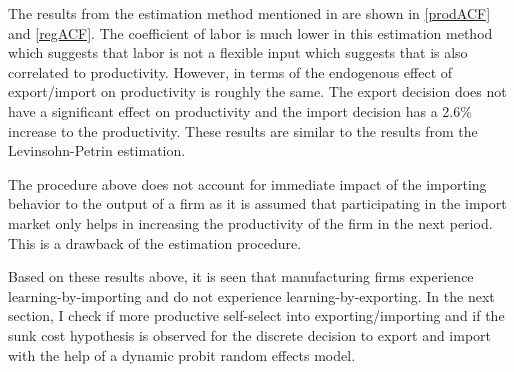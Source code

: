 \documentclass[11pt]{article}
\begin{document}
The results from the estimation  method mentioned in \textcite{ackerberg2006structural} are shown in \ref{prodACF} and
\ref{regACF}. The coefficient of labor is much lower in this
estimation method which suggests that labor is not a flexible input
which suggests that is also correlated to productivity. However, in terms of the endogenous effect
of export/import on productivity is roughly the same. The export
decision does not have a significant effect on productivity and the
import decision has a 2.6\% increase to the productivity. These
results are similar to the results from the Levinsohn-Petrin
estimation. 



The procedure above does not account for immediate impact of the
importing behavior to the output of a firm as it is assumed that
participating in the import market only helps in increasing the
productivity of the firm in the next period. This is a drawback of the
estimation procedure. 


Based on these results above, it is seen that manufacturing firms experience learning-by-importing and
do not experience learning-by-exporting. 
In the next section, I check if more productive self-select into
exporting/importing and if the sunk cost hypothesis is observed for
the discrete decision to export and import with the help of a dynamic probit
random effects model. 
\end{document}
